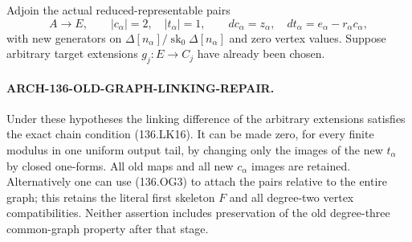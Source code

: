 Adjoin the actual reduced-representable pairs
\[
 A\longrightarrow E,
 \qquad |c_\alpha|=2,\quad |t_\alpha|=1,
 \qquad dc_\alpha=z_\alpha,\quad
              dt_\alpha=e_\alpha-r_\alpha c_\alpha,
                                                               \tag{136.OG4}
\]
with new generators on
\(\Delta[n_\alpha]/\operatorname{sk}_0\Delta[n_\alpha]\)
and zero vertex values.  Suppose arbitrary target extensions
\(g_j:E\to C_j\) have already been chosen.

\paragraph{ARCH-136-OLD-GRAPH-LINKING-REPAIR.}
Under these hypotheses the linking difference of the arbitrary
extensions satisfies the exact chain condition (136.LK16).
It can be made zero, for every finite modulus in one uniform
output tail, by changing only the images of the new \(t_\alpha\)
by closed one-forms.  All old maps and all new \(c_\alpha\)
images are retained.  Alternatively one can use (136.OG3) to
attach the pairs relative to the entire graph; this retains
the literal first skeleton \(F\) and all degree-two vertex
compatibilities.  Neither assertion includes preservation of
the old degree-three common-graph property after that stage.

